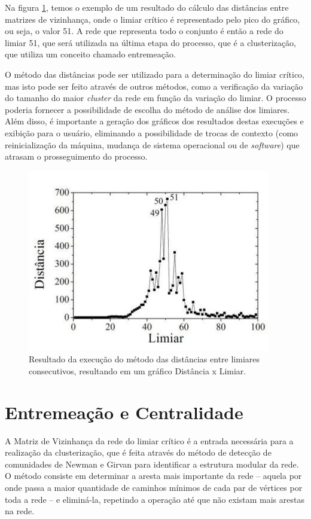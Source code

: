 Na figura \ref{fig:distancia}, temos o exemplo de um resultado do cálculo das distâncias entre matrizes de vizinhança, onde o limiar crítico é representado
pelo pico do gráfico, ou seja, o valor 51. A rede que representa todo o conjunto é então a rede do limiar 51, que será utilizada na última etapa do processo,
que é a clusterização, que utiliza um conceito chamado entremeação.

O método das distâncias pode ser utilizado para a determinação do limiar crítico, mas isto pode ser feito através de outros métodos, como a verificação da
variação do tamanho do maior \textit{cluster} da rede em função da variação do limiar. O processo poderia fornecer a possibilidade de escolha do método de
análise dos limiares. Além disso, é importante a geração dos gráficos dos resultados destas execuções e exibição para o usuário, eliminando a possibilidade
de trocas de contexto (como reinicialização da máquina, mudança de sistema operacional ou de \textit{software}) que atrasam o prosseguimento do processo.

\begin{figure}
\centering
\includegraphics[scale=0.58]{distancia}
\caption{Resultado da execução do método das distâncias entre limiares consecutivos, resultando em um gráfico Distância x Limiar.}
\label{fig:distancia}
\end{figure}

\section{Entremeação e Centralidade} \label{sec:entremeacao}

A Matriz de Vizinhança da rede do limiar crítico é a entrada necessária para a realização da clusterização, que é feita através do método de detecção
de comunidades de Newman e Girvan \cite{newman2004} para identificar a estrutura modular da rede. O método consiste em determinar a aresta mais importante
da rede – aquela por onde passa a maior quantidade de caminhos mínimos de cada par de vértices por toda a rede – e eliminá-la, repetindo a operação
até que não existam mais arestas na rede.

